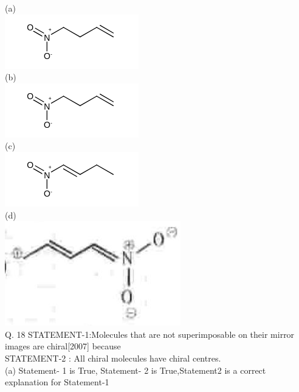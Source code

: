 \documentclass[10pt]{article}
\begin{document}
(a)\\
\includegraphics{smile-b91ca2d17f98a67a8590554e0c0523d07c9e842f}\\
(b)\\
\includegraphics{smile-d8888ab3689489ea4a045df195267cff0a160ea3}\\
(c)\\
\includegraphics{smile-9c48b4a369a18941c1916e36aab8cd25e29e0927}\\
(d)\\
\includegraphics[max width=\textwidth, center]{2025_01_28_8470952b98110cec3aabg-155}\\[0pt]
Q. 18 STATEMENT-1:Molecules that are not superimposable on their mirror images are chiral[2007] because\\
STATEMENT-2 : All chiral molecules have chiral centres.\\
(a) Statement- 1 is True, Statement- 2 is True,Statement2 is a correct explanation for Statement-1\\
\end{document}
